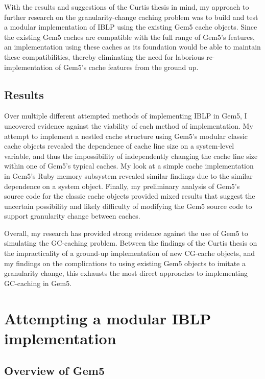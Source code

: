 \documentclass[12pt,twoside]{reedthesis}
\begin{document}
	With the results and suggestions of the Curtis thesis in mind, my approach to further research on the granularity-change caching problem was to build and test a modular implementation of IBLP using the existing Gem5 cache objects. Since the existing Gem5 caches are compatible with the full range of Gem5's features, an implementation using these caches as its foundation would be able to maintain these compatibilities, thereby eliminating the need for laborious re-implementation of Gem5's cache features from the ground up.

\section{Results}

Over multiple different attempted methods of implementing IBLP in Gem5, I uncovered evidence against the viability of each method of implementation. My attempt to implement a nestled cache structure using Gem5's modular classic cache objects revealed the dependence of cache line size on a system-level variable, and thus the impossibility of independently changing the cache line size within one of Gem5's typical caches. My look at a simple cache implementation in Gem5's Ruby memory subsystem revealed similar findings due to the similar dependence on a system object. Finally, my preliminary analysis of Gem5's source code for the classic cache objects provided mixed results that suggest the uncertain possibility and likely difficulty of modifying the Gem5 source code to support granularity change between caches.

Overall, my research has provided strong evidence against the use of Gem5 to simulating the GC-caching problem. Between the findings of the Curtis thesis on the impracticality of a ground-up implementation of new CG-cache objects, and my findings on the complications to using existing Gem5 objects to imitate a granularity change, this exhausts the most direct approaches to implementing GC-caching in Gem5.


\chapter{Attempting a modular IBLP implementation}

\section{Overview of Gem5}
\end{document}
